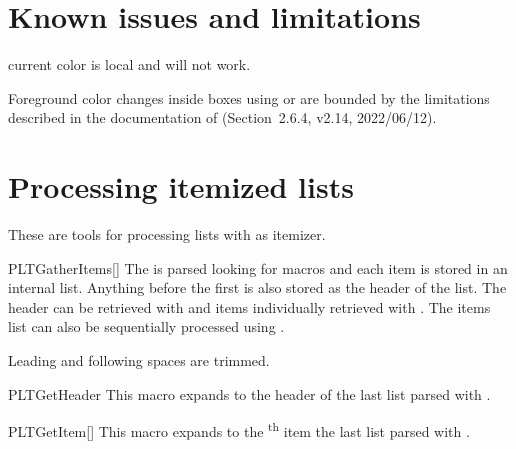 \documentclass[a4paper, 11pt]{article}
\begin{document}
\section{Known issues and limitations}\label{sec:known-issues-and-limitations}

\begin{center}
    \begin{descriptiondescription}
        \item[\PackageName{pgffor}] current color is local and \latexinline{\foreach} will not work.
        \item[] Foreground color changes inside boxes using  or  are bounded by the limitations described in the documentation of  (Section~2.6.4,  v2.14, 2022/06/12).
    \end{descriptiondescription}
\end{center}

\clearpage
\appendix


\section{Processing itemized lists}\label{sec:getitems}
These are tools for processing lists with  as itemizer.

\begin{macro}{PLTGatherItems}[]
    The  is parsed looking for  macros and each item is stored in an internal list. Anything before the first  is also stored as the header of the list. The header can be retrieved with  and items individually retrieved with . The items list can also be sequentially processed using .

    Leading and following spaces are trimmed.
\end{macro}

\begin{macro}{PLTGetHeader}
    This macro expands to the header of the last list parsed with .
\end{macro}

\begin{macro}{PLTGetItem}[]
    This macro expands to the \textsuperscript{th} item the last list parsed with .
\end{macro}
\end{document}
